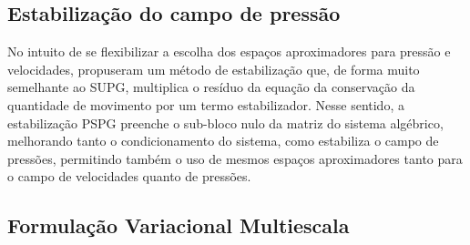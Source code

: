 \subsection{Estabilização do campo de pressão}

No intuito de se flexibilizar a escolha dos espaços aproximadores para pressão e velocidades,  propuseram um método de estabilização que, de forma muito semelhante ao SUPG, multiplica o resíduo da equação da conservação da quantidade de movimento por um termo estabilizador. Nesse sentido, a estabilização PSPG preenche o sub-bloco nulo da matriz do sistema algébrico, melhorando tanto o condicionamento do sistema, como estabiliza o campo de pressões, permitindo também o uso de mesmos espaços aproximadores tanto para o campo de velocidades quanto de pressões.

\subsection{Formulação Variacional Multiescala}




% 

